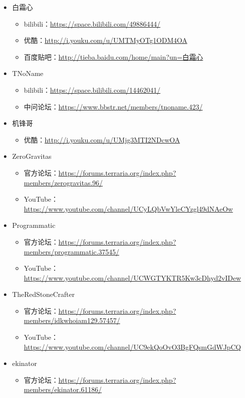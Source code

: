 \begin{itemize}
\begin{itemize}
\end{itemize}
\item 白霜心
\begin{itemize}
    \item bilibili：\url{https://space.bilibili.com/49886444/}
    \item 优酷：\url{http://i.youku.com/u/UMTMyOTg1ODM4OA}
    \item 百度贴吧：\url{http://tieba.baidu.com/home/main?un=白霜心}
\end{itemize}
\item TNoName
\begin{itemize}
    \item bilibili：\url{https://space.bilibili.com/14462041/}
    \item 中问论坛：\url{https://www.bbstr.net/members/tnoname.423/}
\end{itemize}
\item 机锋哥
\begin{itemize}
    \item 优酷：\url{http://i.youku.com/u/UMjg3MTI2NDcwOA}
\end{itemize}
\item ZeroGravitas
\begin{itemize}
    \item 官方论坛：\url{https://forums.terraria.org/index.php?members/zerogravitas.96/}
    \item YouTube：\url{https://www.youtube.com/channel/UCyLQbVwYleCYzgl49dNAeOw}
\end{itemize}
\item Programmatic
\begin{itemize}
    \item 官方论坛：\url{https://forums.terraria.org/index.php?members/programmatic.37545/}
    \item YouTube：\url{https://www.youtube.com/channel/UCWGTYKTR5Kw3cDhyd2vIDew}
\end{itemize}
\item TheRedStoneCrafter
\begin{itemize}
    \item 官方论坛：\url{https://forums.terraria.org/index.php?members/idkwhoiam129.57457/}
    \item YouTube：\url{https://www.youtube.com/channel/UC9ekQoOvO3BgFQsmGdWJpCQ}
\end{itemize}
\item ekinator
\begin{itemize}
    \item 官方论坛：\url{https://forums.terraria.org/index.php?members/ekinator.61186/}

\end{itemize}
\end{itemize}
